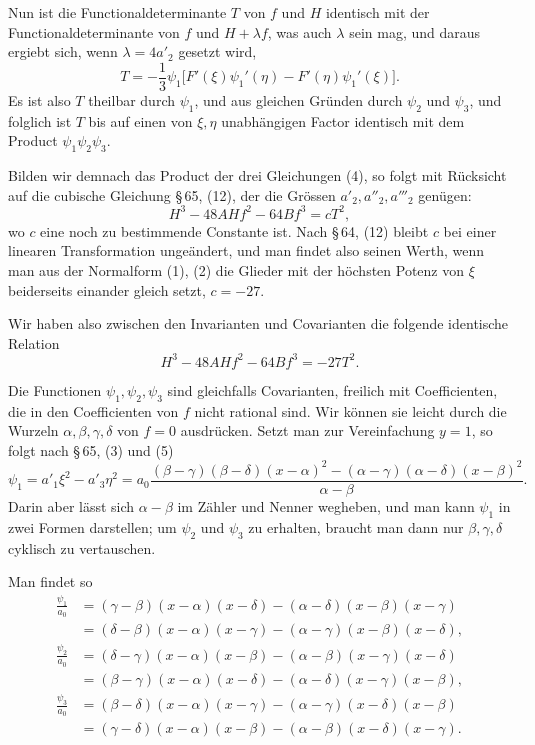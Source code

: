 \documentclass[11pt]{article}
\begin{document}
Nun ist die Functionaldeterminante $T$ von $f$ und $H$ identisch mit der Functionaldeterminante von $f$ und $H+\lambda f$, was auch $\lambda$ sein mag, und daraus ergiebt sich, wenn $\lambda=4a'_2$ gesetzt wird,
\[
 T=-\frac13\psi_1\bigl[F'(\xi)\psi_1'(\eta)-F'(\eta)\psi_1'(\xi)\bigr].
\]
Es ist also $T$ theilbar durch $\psi_1$, und aus gleichen Gründen durch $\psi_2$ und $\psi_3$, und folglich ist $T$ bis auf einen von $\xi,\eta$ unabhängigen Factor identisch mit dem Product $\psi_1\psi_2\psi_3$.

Bilden wir demnach das Product der drei Gleichungen (4), so folgt mit Rücksicht auf die cubische Gleichung \S\,65, (12), der die Grössen $a'_2,a''_2,a'''_2$ genügen:
\[
 H^3-48AHf^2-64Bf^3=cT^2,
\]
wo $c$ eine noch zu bestimmende Constante ist. Nach \S\,64, (12) bleibt $c$ bei einer linearen Transformation ungeändert, und man findet also seinen Werth, wenn man aus der Normalform (1), (2) die Glieder mit der höchsten Potenz von $\xi$ beiderseits einander gleich setzt, $c=-27$.

Wir haben also zwischen den Invarianten und Covarianten die folgende identische Relation
\begin{equation}
 H^3-48AHf^2-64Bf^3=-27T^2.
\tag{5}
\end{equation}

Die Functionen $\psi_1,\psi_2,\psi_3$ sind gleichfalls Covarianten, freilich mit Coefficienten, die in den Coefficienten von $f$ nicht rational sind. Wir können sie leicht durch die Wurzeln $\alpha,\beta,\gamma,\delta$ von $f=0$ ausdrücken. Setzt man zur Vereinfachung $y=1$, so folgt nach \S\,65, (3) und (5)
\[
 \psi_1=a'_1\xi^2-a'_3\eta^2
 =a_0\frac{(\beta-\gamma)(\beta-\delta)(x-\alpha)^2-(\alpha-\gamma)(\alpha-\delta)(x-\beta)^2}{\alpha-\beta}.
\]
Darin aber lässt sich $\alpha-\beta$ im Zähler und Nenner wegheben, und man kann $\psi_1$ in zwei Formen darstellen; um $\psi_2$ und $\psi_3$ zu erhalten, braucht man dann nur $\beta,\gamma,\delta$ cyklisch zu vertauschen.

Man findet so
\begin{equation}
\begin{aligned}
 \frac{\psi_1}{a_0}
 &= (\gamma-\beta)(x-\alpha)(x-\delta)-(\alpha-\delta)(x-\beta)(x-\gamma)\\
 &= (\delta-\beta)(x-\alpha)(x-\gamma)-(\alpha-\gamma)(x-\beta)(x-\delta),\\[0.4em]
 \frac{\psi_2}{a_0}
 &= (\delta-\gamma)(x-\alpha)(x-\beta)-(\alpha-\beta)(x-\gamma)(x-\delta)\\
 &= (\beta-\gamma)(x-\alpha)(x-\delta)-(\alpha-\delta)(x-\gamma)(x-\beta),\\[0.4em]
 \frac{\psi_3}{a_0}
 &= (\beta-\delta)(x-\alpha)(x-\gamma)-(\alpha-\gamma)(x-\delta)(x-\beta)\\
 &= (\gamma-\delta)(x-\alpha)(x-\beta)-(\alpha-\beta)(x-\delta)(x-\gamma).
\end{aligned}
\tag{6}
\end{equation}
\end{document}
